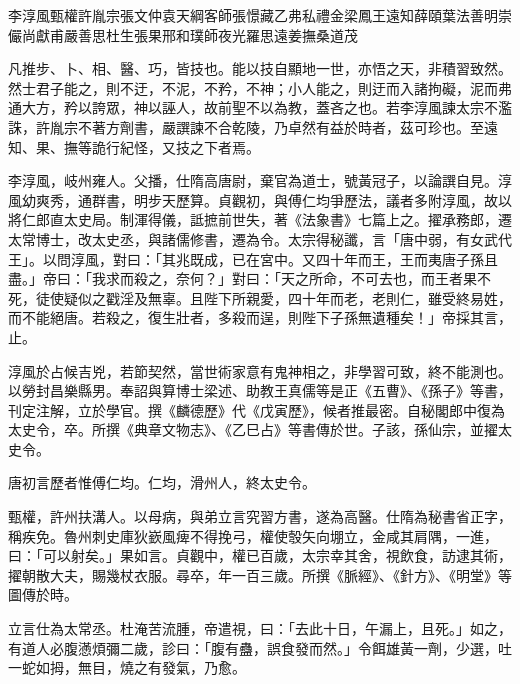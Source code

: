 
\begin{pinyinscope}

 李淳風甄權許胤宗張文仲袁天綱客師張憬藏乙弗私禮金梁鳳王遠知薛頤葉法善明崇儼尚獻甫嚴善思杜生張果邢和璞師夜光羅思遠姜撫桑道茂



 凡推步、卜、相、醫、巧，皆技也。能以技自顯地一世，亦悟之天，非積習致然。然士君子能之，則不迂，不泥，不矜，不神；小人能之，則迂而入諸拘礙，泥而弗通大方，矜以誇眾，神以誣人，故前聖不以為教，蓋吝之也。若李淳風諫太宗不濫誅，許胤宗不著方劑書，嚴譔諫不合乾陵，乃卓然有益於時者，茲可珍也。至遠知、果、撫等詭行紀怪，又技之下者焉。



 李淳風，岐州雍人。父播，仕隋高唐尉，棄官為道士，號黃冠子，以論譔自見。淳風幼爽秀，通群書，明步天歷算。貞觀初，與傅仁均爭歷法，議者多附淳風，故以將仁郎直太史局。制渾得儀，詆摭前世失，著《法象書》七篇上之。擢承務郎，遷太常博士，改太史丞，與諸儒修書，遷為令。太宗得秘讖，言「唐中弱，有女武代王」。以問淳風，對曰：「其兆既成，已在宮中。又四十年而王，王而夷唐子孫且盡。」帝曰：「我求而殺之，奈何？」對曰：「天之所命，不可去也，而王者果不死，徒使疑似之戳淫及無辜。且陛下所親愛，四十年而老，老則仁，雖受終易姓，而不能絕唐。若殺之，復生壯者，多殺而逞，則陛下子孫無遺種矣！」帝採其言，止。



 淳風於占候吉兇，若節契然，當世術家意有鬼神相之，非學習可致，終不能測也。以勞封昌樂縣男。奉詔與算博士梁述、助教王真儒等是正《五曹》、《孫子》等書，刊定注解，立於學官。撰《麟德歷》代《戊寅歷》，候者推最密。自秘閣郎中復為太史令，卒。所撰《典章文物志》、《乙巳占》等書傳於世。子該，孫仙宗，並擢太史令。



 唐初言歷者惟傅仁均。仁均，滑州人，終太史令。



 甄權，許州扶溝人。以母病，與弟立言究習方書，遂為高醫。仕隋為秘書省正字，稱疾免。魯州刺史庫狄嶔風痺不得挽弓，權使彀矢向堋立，金咸其肩隅，一進，曰：「可以射矣。」果如言。貞觀中，權已百歲，太宗幸其舍，視飲食，訪逮其術，擢朝散大夫，賜幾杖衣服。尋卒，年一百三歲。所撰《脈經》、《針方》、《明堂》等圖傳於時。



 立言仕為太常丞。杜淹苦流腫，帝遣視，曰：「去此十日，午漏上，且死。」如之，有道人必腹懣煩彌二歲，診曰：「腹有蠱，誤食發而然。」令餌雄黃一劑，少選，吐一蛇如拇，無目，燒之有發氣，乃愈。




\end{pinyinscope}
